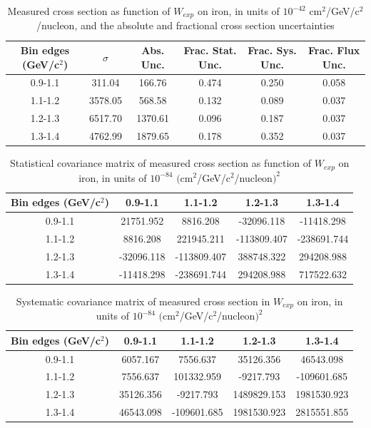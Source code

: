 \documentclass[../main.tex]{subfiles}
\begin{document}
\pagebreak
\begin{turnpage}
\end{turnpage}
\begin{table}
  \centering
  \renewcommand{\arraystretch}{1.15}
  \caption{Measured cross section as function of $W_{exp}$ on iron, in units of $10^{-42}$ $\text{cm}^2$/GeV/c${}^2$/nucleon, and the absolute and fractional cross section uncertainties}
    \begin{tabular}{c||c|c||c|c|c}
      Bin edges (GeV/c${}^2$) &  $\sigma$  &  Abs. Unc.  &  Frac. Stat. Unc.  &  Frac. Sys. Unc.  &  Frac. Flux Unc. \\
      \hline
      \hline
      0.9-1.1 & 311.04 & 166.76 & 0.474 & 0.250 & 0.058\\
      1.1-1.2 & 3578.05 & 568.58 & 0.132 & 0.089 & 0.037\\
      1.2-1.3 & 6517.70 & 1370.61 & 0.096 & 0.187 & 0.037\\
      1.3-1.4 & 4762.99 & 1879.65 & 0.178 & 0.352 & 0.037
    \end{tabular}
  \label{tbl:datanucleonnuc26Wa}
\end{table}
\begin{table}
  \centering
  \renewcommand{\arraystretch}{1.15}
  \caption{Statistical covariance matrix of measured cross section as function of $W_{exp}$ on iron, in units of $10^{-84}$ $(\text{cm}^2$/GeV/c${}^2$/nucleon$)^2$}
    \begin{tabular}{c||cccc}
      Bin edges (GeV/c${}^2$) & 0.9-1.1 & 1.1-1.2 & 1.2-1.3 & 1.3-1.4\\
      \hline
      \hline
      0.9-1.1 & 21751.952 & 8816.208 & -32096.118 & -11418.298\\
      1.1-1.2 & 8816.208 & 221945.211 & -113809.407 & -238691.744\\
      1.2-1.3 & -32096.118 & -113809.407 & 388748.322 & 294208.988\\
      1.3-1.4 & -11418.298 & -238691.744 & 294208.988 & 717522.632
    \end{tabular}
  \label{tbl:statnucleonnuc26Wb}
\end{table}
\begin{table}
  \centering
  \renewcommand{\arraystretch}{1.15}
  \caption{Systematic covariance matrix of measured cross section in $W_{exp}$ on iron, in units of $10^{-84}$ $(\text{cm}^2$/GeV/c${}^2$/nucleon$)^2$}
    \begin{tabular}{c||cccc}
      Bin edges (GeV/c${}^2$) & 0.9-1.1 & 1.1-1.2 & 1.2-1.3 & 1.3-1.4\\
      \hline
      \hline
      0.9-1.1 & 6057.167 & 7556.637 & 35126.356 & 46543.098\\
      1.1-1.2 & 7556.637 & 101332.959 & -9217.793 & -109601.685\\
      1.2-1.3 & 35126.356 & -9217.793 & 1489829.153 & 1981530.923\\
      1.3-1.4 & 46543.098 & -109601.685 & 1981530.923 & 2815551.855
    \end{tabular}
  \label{tbl:sysnucleonnuc26Wc}
\end{table}
\end{document}
